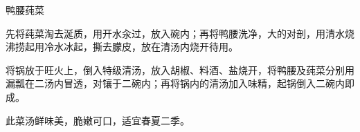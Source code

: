%
%
%
%
%
%
%
\begin{recipe}{鸭腰莼菜}

\ingredients


\preparation

\step 先将莼菜淘去涎质，用开水汆过，放入碗内；再将鸭腰洗净，大的对剖，用清水烧
沸捞起用冷水冰起，撕去朦皮，放在清汤内烧开待用。

\step 将锅放于旺火上，倒入特级清汤，放入胡椒、料酒、盐烧开，将鸭腰及莼菜分别用
漏瓢在二汤内冒透，对镶于二碗内；再将锅内的清汤加入味精，起锅倒入二碗内即成。

\features

此菜汤鲜味美，脆嫩可口，适宜春夏二季。

\end{recipe}

